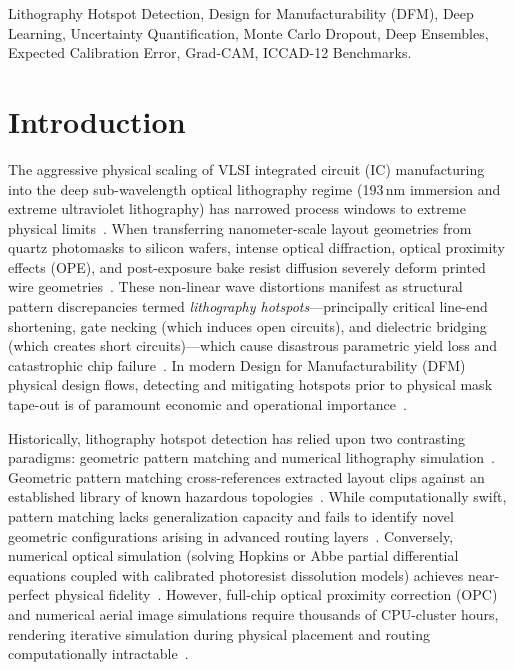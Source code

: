 \documentclass[11pt,journal,onecolumn]{IEEEtran}
\begin{document}
\begin{IEEEkeywords}
Lithography Hotspot Detection, Design for Manufacturability (DFM), Deep Learning, Uncertainty Quantification, Monte Carlo Dropout, Deep Ensembles, Expected Calibration Error, Grad-CAM, ICCAD-12 Benchmarks.
\end{IEEEkeywords}

\bigskip

\section{Introduction}
The aggressive physical scaling of VLSI integrated circuit (IC) manufacturing into the deep sub-wavelength optical lithography regime (193\,nm immersion and extreme ultraviolet lithography) has narrowed process windows to extreme physical limits~\cite{wong2001resolution, mack2007fundamental}. When transferring nanometer-scale layout geometries from quartz photomasks to silicon wafers, intense optical diffraction, optical proximity effects (OPE), and post-exposure bake resist diffusion severely deform printed wire geometries~\cite{dai2006optical, liebmann2003layout}. These non-linear wave distortions manifest as structural pattern discrepancies termed \textit{lithography hotspots}---principally critical line-end shortening, gate necking (which induces open circuits), and dielectric bridging (which creates short circuits)---which cause disastrous parametric yield loss and catastrophic chip failure~\cite{yu2018dfm, gao2014lithography}. In modern Design for Manufacturability (DFM) physical design flows, detecting and mitigating hotspots prior to physical mask tape-out is of paramount economic and operational importance~\cite{mitra2009accurate}.

Historically, lithography hotspot detection has relied upon two contrasting paradigms: geometric pattern matching and numerical lithography simulation~\cite{gupta2006accurate, lucas2010pattern}. Geometric pattern matching cross-references extracted layout clips against an established library of known hazardous topologies~\cite{matsunawa2015optical}. While computationally swift, pattern matching lacks generalization capacity and fails to identify novel geometric configurations arising in advanced routing layers~\cite{lucas2010pattern}. Conversely, numerical optical simulation (solving Hopkins or Abbe partial differential equations coupled with calibrated photoresist dissolution models) achieves near-perfect physical fidelity~\cite{brunner2011why, cobb1995fast}. However, full-chip optical proximity correction (OPC) and numerical aerial image simulations require thousands of CPU-cluster hours, rendering iterative simulation during physical placement and routing computationally intractable~\cite{yu2007fast, smayling2012lithography}.
\end{document}
